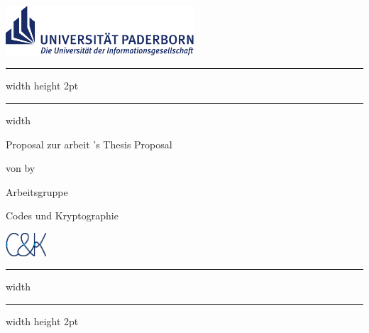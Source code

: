 \thispagestyle{plain}

\includegraphics[width=7cm]{figures/upb_logo}

\bigskip

\hrule width \hsize height 2pt \kern 1mm \hrule width \hsize
\vspace*{6pt}

\begin{center}
	\Large\textbf{\Title}
\end{center}

\noindent
\begin{minipage}{6cm}
	\large{
		\ifgerman
			Proposal zur \Degree arbeit
		\else
			\Degree 's Thesis Proposal
		\fi
	}

	\ifgerman
		\large von
	\else
		\large by
	\fi
	\Author
\end{minipage}
\hfill
\begin{minipage}{6cm}
	\begin{minipage}{4.4cm}
		\flushright
		\normalsize Arbeitsgruppe

		Codes und Kryptographie
	\end{minipage}
	\begin{minipage}{1.5cm}
			\includegraphics[width=1.5cm]{figures/cuk_logo}
	\end{minipage}
\end{minipage}

\bigskip

\hrule width \hsize \kern 1mm \hrule width \hsize height 2pt
